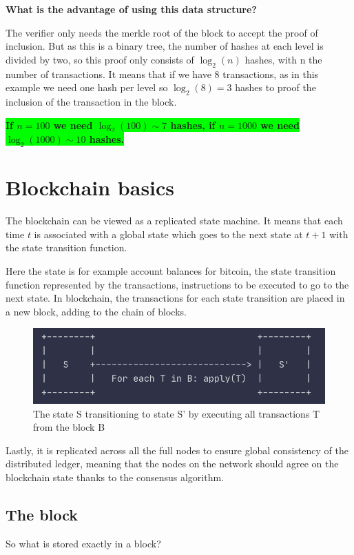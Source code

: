 \textbf{
What is the advantage of using this data structure?}

The verifier only needs the merkle root of the block to accept the proof of inclusion. But as this is a binary tree, the number of hashes at each level is divided by two, so this proof only consists of $\log_2(n)$ hashes, with n the number of transactions. 
It means that if we have 8 transactions, as in this example we  need one hash per level so $\log_2(8)=3$ hashes to proof the inclusion of the transaction in the block.

\colorbox{lime}{
\textbf{
If $n=100$ we need $\log_2(100)\sim 7$ hashes, if $n=1000$ we need $\log_2(1000)\sim 10$ hashes.
}
}


\section{Blockchain basics}

The blockchain can be viewed as a replicated state machine. It means that  each time $t$ is associated with a global state which goes to the next state at $t+1$ with the state transition function. 

Here the state is for example account balances for bitcoin, the state transition function represented by the transactions, instructions to be executed to go to the next state.
In blockchain, the transactions for each state transition are placed in a new block, adding to the chain of blocks.
\begin{figure}[H]
\centering
\includegraphics[width=0.6\linewidth]{background/state_transition.png}
    \caption{The state S transitioning to state S' by executing all transactions T from the block B}
    \label{fig:state_transition}
\end{figure}
Lastly, it is replicated across all the full nodes to ensure global consistency of the distributed ledger, meaning that the nodes on the network should agree on the blockchain state thanks to the consensus algorithm.

\subsection{The block}
So what is stored exactly in a block? 

